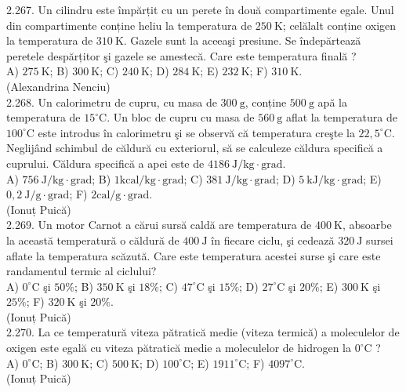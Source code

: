\documentclass[10pt]{article}
\begin{document}
2.267. Un cilindru este împărțit cu un perete în două compartimente egale. Unul din compartimente conține heliu la temperatura de $250 \mathrm{~K}$; celălalt conține oxigen la temperatura de $310 \mathrm{~K}$. Gazele sunt la aceeaşi presiune. Se îndepărtează peretele despărțitor şi gazele se amestecă. Care este temperatura finală ?\\ A) $275 \mathrm{~K}$; B) $300 \mathrm{~K}$; C) $240 \mathrm{~K}$; D) $284 \mathrm{~K}$; E) $232 \mathrm{~K}$; F) $310 \mathrm{~K}$.\\ (Alexandrina Nenciu)\\

2.268. Un calorimetru de cupru, cu masa de $300 \mathrm{~g}$, conține $500 \mathrm{~g}$ apă la temperatura de $15^{\circ} \mathrm{C}$. Un bloc de cupru cu masa de $560 \mathrm{~g}$ aflat la temperatura de $100^{\circ} \mathrm{C}$ este introdus în calorimetru şi se observă că temperatura creşte la $22,5^{\circ} \mathrm{C}$. Neglijând schimbul de căldură cu exteriorul, să se calculeze căldura specifică a cuprului. Căldura specifică a apei este de $4186 \mathrm{~J} / \mathrm{kg} \cdot \mathrm{grad}$.\\ A) $756 \mathrm{~J} / \mathrm{kg} \cdot \mathrm{grad}$; B) $1 \mathrm{kcal} / \mathrm{kg} \cdot \mathrm{grad}$; C) $381 \mathrm{~J} / \mathrm{kg} \cdot \mathrm{grad}$; D) $5 \mathrm{~kJ} / \mathrm{kg} \cdot \mathrm{grad}$; E) $0,2 \mathrm{~J} / \mathrm{g} \cdot \mathrm{grad}$; F) $2 \mathrm{cal} / \mathrm{g} \cdot \mathrm{grad}$.\\ (Ionuț Puică)\\

2.269. Un motor Carnot a cărui sursă caldă are temperatura de $400 \mathrm{~K}$, absoarbe la această temperatură o căldură de $400 \mathrm{~J}$ în fiecare ciclu, şi cedează $320 \mathrm{~J}$ sursei aflate la temperatura scăzută. Care este temperatura acestei surse şi care este randamentul termic al ciclului?\\ A) $0^{\circ} \mathrm{C}$ şi $50 \%$; B) $350 \mathrm{~K}$ şi $18 \%$; C) $47^{\circ} \mathrm{C}$ şi $15 \%$; D) $27^{\circ} \mathrm{C}$ şi $20 \%$; E) $300 \mathrm{~K}$ şi $25 \%$; F) $320 \mathrm{~K}$ şi $20 \%$.\\ (Ionuț Puică)\\

2.270. La ce temperatură viteza pătratică medie (viteza termică) a moleculelor de oxigen este egală cu viteza pătratică medie a moleculelor de hidrogen la $0^{\circ} \mathrm{C}$ ?\\ A) $0^{\circ} \mathrm{C}$; B) $300 \mathrm{~K}$; C) $500 \mathrm{~K}$; D) $100^{\circ} \mathrm{C}$; E) $1911^{\circ} \mathrm{C}$; F) $4097^{\circ} \mathrm{C}$.\\ (Ionuț Puică)\\
\end{document}
